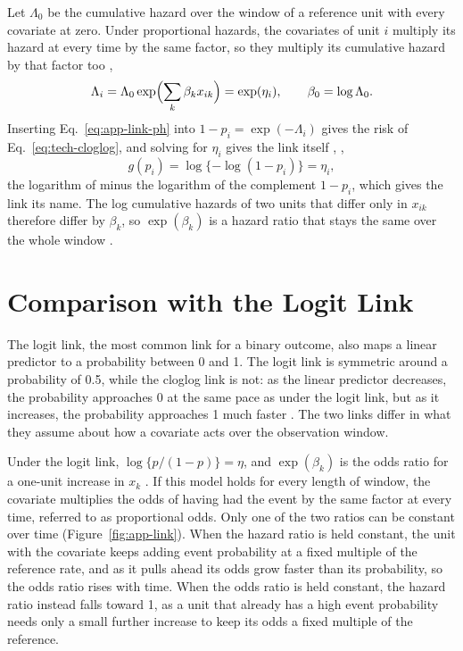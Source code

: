Let $\Lambda_0$ be the cumulative hazard over the window of a reference unit with every covariate at zero.
Under proportional hazards, the covariates of unit $i$ multiply its hazard at every time by the same factor, so they multiply its cumulative hazard by that factor too \cite[Section~10.2.2, Eqs.~10.7--10.9]{dobson2002glm},
\begin{equation}
  \Lambda_i = \Lambda_0 \exp\Bigl(\sum_k \beta_k x_{ik}\Bigr) = \exp(\eta_i),
  \qquad
  \beta_0 = \log \Lambda_0 .
  \label{eq:app-link-ph}
\end{equation}
Inserting Eq.~\eqref{eq:app-link-ph} into $1 - p_i = \exp(-\Lambda_i)$ gives the risk of Eq.~\eqref{eq:tech-cloglog}, and solving for $\eta_i$ gives the link itself \cite[Section~7.3]{dobson2002glm}, \cite[pp.~58--59, Eqs.~2--5]{prentice1978grouped},
\begin{equation}
  g(p_i) = \log\{-\log(1 - p_i)\} = \eta_i ,
  \label{eq:app-link-cloglog}
\end{equation}
the logarithm of minus the logarithm of the complement $1 - p_i$, which gives the link its name.
The log cumulative hazards of two units that differ only in $x_{ik}$ therefore differ by $\beta_k$, so $\exp(\beta_k)$ is a hazard ratio that stays the same over the whole window \cite[Section~10.2.3, Eq.~10.13]{dobson2002glm}.

\section{Comparison with the Logit Link}
\label{app:link-logit}

The logit link, the most common link for a binary outcome, also maps a linear predictor to a probability between 0 and 1.
The logit link is symmetric around a probability of 0.5, while the cloglog link is not: as the linear predictor decreases, the probability approaches 0 at the same pace as under the logit link, but as it increases, the probability approaches 1 much faster \cite[Section~7.3]{dobson2002glm}.
The two links differ in what they assume about how a covariate acts over the observation window.

Under the logit link, $\log\{p/(1-p)\} = \eta$, and $\exp(\beta_k)$ is the odds ratio for a one-unit increase in $x_k$ \cite[Section~8.3]{dobson2002glm}.
If this model holds for every length of window, the covariate multiplies the odds of having had the event by the same factor at every time, referred to as proportional odds.
Only one of the two ratios can be constant over time (Figure~\ref{fig:app-link}).
When the hazard ratio is held constant, the unit with the covariate keeps adding event probability at a fixed multiple of the reference rate, and as it pulls ahead its odds grow faster than its probability, so the odds ratio rises with time.
When the odds ratio is held constant, the hazard ratio instead falls toward 1, as a unit that already has a high event probability needs only a small further increase to keep its odds a fixed multiple of the reference.

